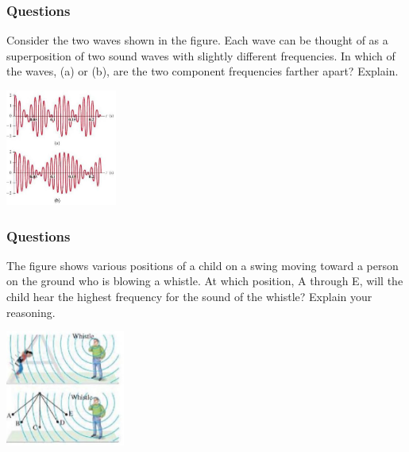 \documentclass[]{beamer}
\begin{document}

\begin{frame}
\frametitle{Questions}

Consider the two waves shown in the figure. Each wave can
be thought of as a superposition of two sound waves with
slightly different frequencies. In which of
the waves, (a) or (b), are the two component frequencies
farther apart? Explain.

  \begin{center}
  \includegraphics[height=1.5in]{images4/Q_ondas.jpg}
\end{center}


  \end{frame}



\begin{frame}
\frametitle{Questions}

The figure shows various positions of a child on a swing
moving toward a person on the ground who is blowing a
whistle. At which position, A through E, will the child hear
the highest frequency for the sound of the whistle? Explain
your reasoning.

  \begin{center}
  \includegraphics[height=1.5in]{images4/Q_ondas2.jpg}
\end{center}


  \end{frame}






 
\end{document}
